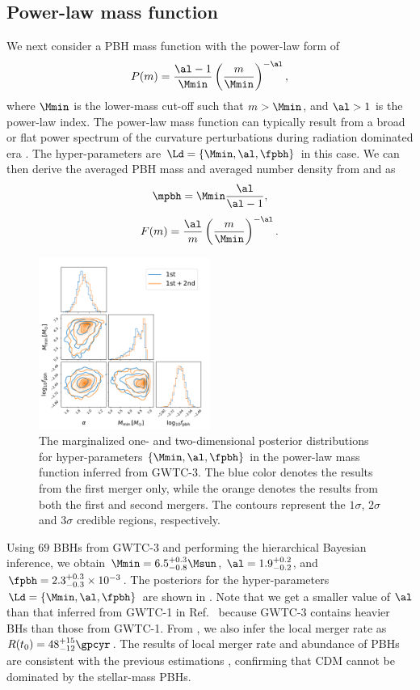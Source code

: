 \documentclass[
reprint,           %
superscriptaddress,%
amsmath,           %
amssymb,           %
aps,               %
prd,               %
notitlepage,       %
longbibliography,  %
floatfix,          %
nofootinbib,
]{revtex4-1}
\def\({\left(}
\def\){\right)}
\def\e{\begin{equation}}
\def\q{\end{equation}}
\begin{document}
\subsection{Power-law mass function}


We next consider a PBH mass function with the power-law form of \cite{Carr:1975qj}
\e\label{power} 
P(m) = \frac{\al-1}{\Mmin} \(\frac{m}{\Mmin}\)^{-\al},
\q
where $\Mmin$ is the lower-mass cut-off such that $m>\Mmin$, and $\al>1$ is the power-law index. 
The power-law mass function can typically result from a broad or flat power spectrum of the curvature perturbations \cite{DeLuca:2020ioi} during radiation dominated era \cite{Carr:2016drx,Carr:2017jsz}.
The hyper-parameters are $\Ld = \{\Mmin, \al, \fpbh\}$ in this case. 
We can then derive the averaged PBH mass and averaged number density from  and  as
\e
\mpbh = \Mmin \frac{\al}{\al-1},
\q
\e 
F(m) = \frac{\al}{m} \(\frac{m}{\Mmin}\)^{-\al}.
\q

\begin{figure}[tbp!]
	\centering
	\includegraphics[width=0.5\textwidth]{post-power.pdf}
	\caption{\label{posterior-power}The marginalized one- and two-dimensional posterior distributions for hyper-parameters $\{\Mmin, \al, \fpbh\}$ in the power-law mass function inferred from GWTC-3. The blue color denotes the results from the first merger only, while the orange denotes the results from both the first and second mergers. The contours represent the $1\sigma$, $2\sigma$ and $3\sigma$ credible regions, respectively.}
\end{figure}

Using $69$ BBHs from GWTC-3 and performing the hierarchical Bayesian inference, we obtain $\Mmin = 6.5^{+0.3}_{-0.8} \Msun$, $\al = 1.9^{+0.2}_{-0.2}$, and $\fpbh = 2.3^{+0.3}_{-0.3} \times 10^{-3}$. The posteriors for the hyper-parameters $\Ld = \{\Mmin, \al, \fpbh\}$ are shown in . Note that we get a smaller value of $\al$ than that inferred from GWTC-1 in Ref.~\cite{Wu:2020drm} because GWTC-3 contains heavier BHs than those from GWTC-1. From , we also infer the local merger rate as $R(t_0) = 48^{+15}_{-12} \gpcyr$. The results of local merger rate and abundance of PBHs are consistent with the previous estimations \cite{Chen:2018czv,Chen:2018rzo,Chen:2019irf,Wu:2020drm,Chen:2021nxo,Chen:2022fda}, confirming that CDM cannot be dominated by the stellar-mass PBHs.
\end{document}
